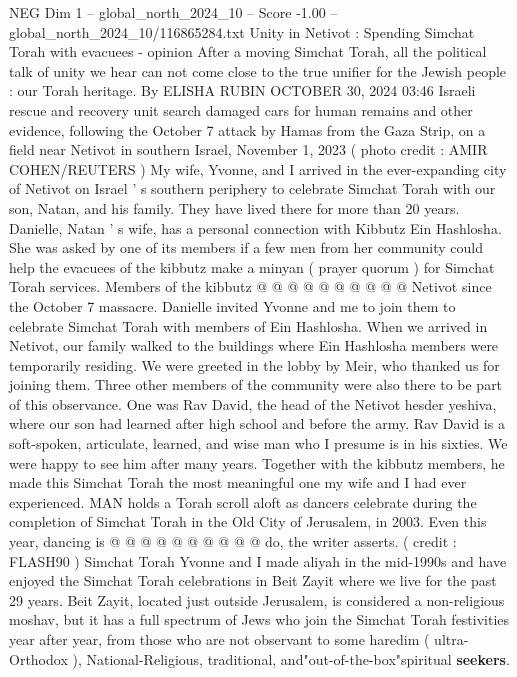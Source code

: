 \begin{textsample}{NEG Dim 1 – global\_north\_2024\_10 – Score -1.00 – global\_north\_2024\_10/116865284.txt}  \label{ex:f1_neg_368}
Unity in Netivot : Spending Simchat Torah with evacuees - opinion After a moving Simchat Torah, all the political talk of unity we hear can not come close to the true unifier for the Jewish people : our Torah heritage.
By ELISHA RUBIN OCTOBER 30, 2024 03:46 Israeli rescue and recovery unit search damaged cars for human remains and other evidence, following the October 7 attack by Hamas from the Gaza Strip, on a field near Netivot in southern Israel, November 1, 2023 ( photo credit : AMIR COHEN/REUTERS ) My wife, Yvonne, and I arrived in the ever-expanding city of Netivot on Israel ' s southern periphery to celebrate Simchat Torah with our son, Natan, and his family.
They have lived there for more than 20 years.
Danielle, Natan ' s wife, has a personal connection with Kibbutz Ein Hashlosha.
She was asked by one of its members if a few men from her community could help the evacuees of the kibbutz make a minyan ( prayer quorum ) for Simchat Torah services.
Members of the kibbutz @ @ @ @ @ @ @ @ @ @ Netivot since the October 7 massacre.
Danielle invited Yvonne and me to join them to celebrate Simchat Torah with members of Ein Hashlosha.
When we arrived in Netivot, our family walked to the buildings where Ein Hashlosha members were temporarily residing.
We were greeted in the lobby by Meir, who thanked us for joining them.
Three other members of the community were also there to be part of this observance.
One was Rav David, the head of the Netivot hesder yeshiva, where our son had learned after high school and before the army.
Rav David is a soft-spoken, articulate, learned, and wise man who I presume is in his sixties.
We were happy to see him after many years.
Together with the kibbutz members, he made this Simchat Torah the most meaningful one my wife and I had ever experienced.
MAN holds a Torah scroll aloft as dancers celebrate during the completion of Simchat Torah in the Old City of Jerusalem, in 2003.
Even this year, dancing is @ @ @ @ @ @ @ @ @ @ do, the writer asserts. ( credit : FLASH90 ) Simchat Torah Yvonne and I made aliyah in the mid-1990s and have enjoyed the Simchat Torah celebrations in Beit Zayit where we live for the past 29 years.
Beit Zayit, located just outside Jerusalem, is considered a non-religious moshav, but it has a full spectrum of Jews who join the Simchat Torah festivities year after year, from those who are not observant to some haredim ( ultra-Orthodox ), National-Religious, traditional, and"out-of-the-box"spiritual \textbf{seekers}.

\end{textsample}
